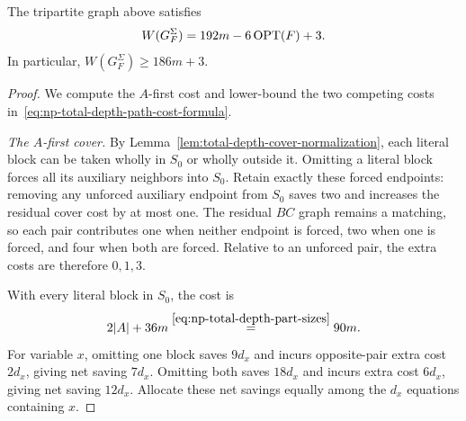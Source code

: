 \begin{proposition}
\label{prop:np-total-depth-parity-identity}
The tripartite graph above satisfies
\begin{equation}\label{eq:np-total-depth-parity-W}
 W(G_F^\Sigma)=192m-6\operatorname{OPT}(F)+3.
\end{equation}
In particular, $W(G_F^\Sigma)\geq186m+3$.
\end{proposition}

\begin{proof}
We compute the $A$-first cost and lower-bound the two competing costs
in~\eqref{eq:np-total-depth-path-cost-formula}.

\emph{The $A$-first cover.}
By Lemma~\ref{lem:total-depth-cover-normalization}, each literal block
can be taken wholly in $S_0$ or wholly outside it. Omitting a literal
block forces all its auxiliary neighbors into $S_0$. Retain exactly
these forced endpoints: removing any unforced auxiliary endpoint from
$S_0$ saves two and increases the residual cover cost by at most one.
The residual $BC$ graph remains a matching, so each pair contributes
one when neither endpoint is forced, two when one is forced, and four
when both are forced. Relative to an unforced pair, the extra costs
are therefore $0,1,3$.

With every literal block in $S_0$, the cost is
\begin{equation}\label{eq:np-total-depth-A-baseline}
 2|A|+36m\overset{\eqref{eq:np-total-depth-part-sizes}}{=}90m.
\end{equation}
For variable $x$, omitting one block saves $9d_x$
and incurs opposite-pair extra cost $2d_x$, giving net saving $7d_x$.
Omitting both saves $18d_x$ and incurs extra cost $6d_x$, giving net
saving $12d_x$. Allocate these net savings equally among the $d_x$
equations containing $x$.


\end{proof}
